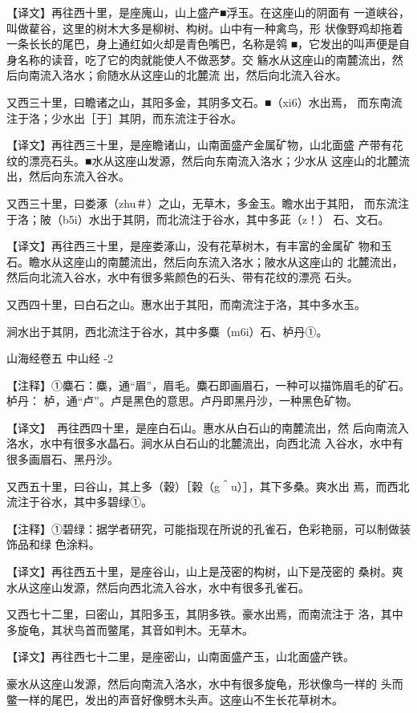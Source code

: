 \documentclass[a4paper,12pt,UTF8,twoside]{ctexbook}
\begin{document}
【译文】再往西十里，是座廆山，山上盛产■浮玉。在这座山的阴面有 一道峡谷，叫做雚谷，这里的树木大多是柳树、构树。山中有一种禽鸟，形 状像野鸡却拖着一条长长的尾巴，身上通红如火却是青色嘴巴，名称是鸰 ■，它发出的叫声便是自身名称的读音，吃了它的肉就能使人不做恶梦。交 觞水从这座山的南麓流出，然后向南流入洛水；俞随水从这座山的北麓流 出，然后向北流入谷水。

又西三十里，曰瞻诸之山，其阳多金，其阴多文石。■（xi6）水出焉， 而东南流注于洛；少水出［于］其阴，而东流注于谷水。

【译文】再往西三十里，是座瞻诸山，山南面盛产金属矿物，山北面盛 产带有花纹的漂亮石头。■水从这座山发源，然后向东南流入洛水；少水从 这座山的北麓流出，然后向东流入谷水。

又西三十里，曰娄涿（zhu＃）之山，无草木，多金玉。瞻水出于其阳， 而东流注于洛；陂（b5i）水出于其阴，而北流注于谷水，其中多茈（z！） 石、文石。

【译文】再往西三十里，是座娄涿山，没有花草树木，有丰富的金属矿 物和玉石。瞻水从这座山的南麓流出，然后向东流入洛水；陂水从这座山的 北麓流出，然后向北流入谷水，水中有很多紫颜色的石头、带有花纹的漂亮 石头。

又西四十里，曰白石之山。惠水出于其阳，而南流注于洛，其中多水玉。

涧水出于其阴，西北流注于谷水，其中多麋（m6i）石、栌丹①。


山海经卷五 中山经 -2

【注释】①麋石：麋，通“眉”，眉毛。麋石即画眉石，一种可以描饰眉毛的矿石。栌丹： 栌，通“卢”。卢是黑色的意思。卢丹即黑丹沙，一种黑色矿物。

【译文】　再往西四十里，是座白石山。惠水从白石山的南麓流出，然 后向南流入洛水，水中有很多水晶石。涧水从白石山的北麓流出，向西北流 入谷水，水中有很多画眉石、黑丹沙。

又西五十里，曰谷山，其上多（穀）［榖（g＾u）］，其下多桑。爽水出 焉，而西北流注于谷水，其中多碧绿①。

【注释】①碧绿：据学者研究，可能指现在所说的孔雀石，色彩艳丽，可以制做装饰品和绿 色涂料。

【译文】再往西五十里，是座谷山，山上是茂密的构树，山下是茂密的 桑树。爽水从这座山发源，然后向西北流入谷水，水中有很多孔雀石。

又西七十二里，曰密山，其阳多玉，其阴多铁。豪水出焉，而南流注于 洛，其中多旋龟，其状鸟首而鳖尾，其音如判木。无草木。

【译文】再往西七十二里，是座密山，山南面盛产玉，山北面盛产铁。

豪水从这座山发源，然后向南流入洛水，水中有很多旋龟，形状像鸟一样的 头而鳖一样的尾巴，发出的声音好像劈木头声。这座山不生长花草树木。
\end{document}

